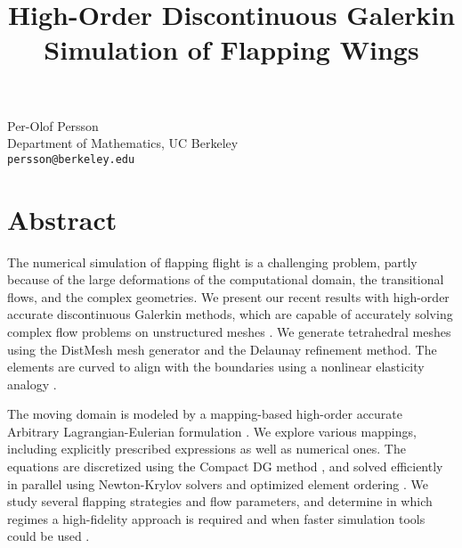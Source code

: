 \title{High-Order Discontinuous Galerkin Simulation of Flapping Wings}
\author{} \institute{}
\maketitle

\begin{center}
{\large Per-Olof Persson}\\
Department of Mathematics, UC Berkeley\\
{\tt persson@berkeley.edu}
\end{center}

\section*{Abstract}
The numerical simulation of flapping flight is a challenging problem, partly because of the large deformations of the computational domain, the transitional flows, and the complex geometries. We present our recent results with high-order accurate discontinuous Galerkin methods, which are capable of accurately solving complex flow problems on unstructured meshes \cite{1}. We generate tetrahedral meshes using the DistMesh mesh generator and the Delaunay refinement method. The elements are curved to align with the boundaries using a nonlinear elasticity analogy \cite{2}.

The moving domain is modeled by a mapping-based high-order accurate Arbitrary Lagrangian-Eulerian formulation \cite{3}. We explore various mappings, including explicitly prescribed expressions as well as numerical ones. The equations are discretized using the Compact DG method \cite{4}, and solved efficiently in parallel using Newton-Krylov solvers and optimized element ordering \cite{5}. We study several flapping strategies and flow parameters, and determine in which regimes a high-fidelity approach is required and when faster simulation tools could be used \cite{6}.

